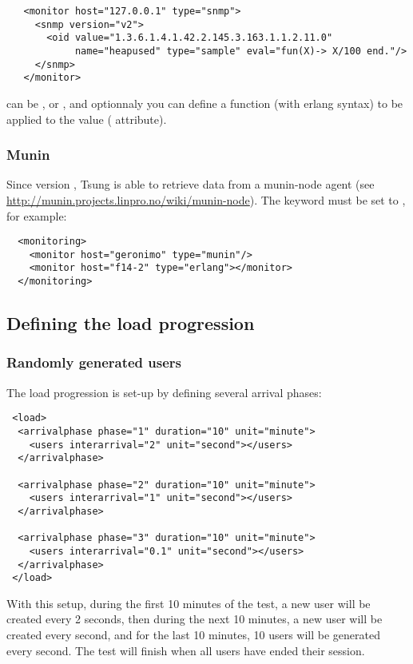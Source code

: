 \documentclass{TSUNG-en}
\begin{document}
\begin{Verbatim}
   <monitor host="127.0.0.1" type="snmp">
     <snmp version="v2">
       <oid value="1.3.6.1.4.1.42.2.145.3.163.1.1.2.11.0"
            name="heapused" type="sample" eval="fun(X)-> X/100 end."/>
     </snmp>
   </monitor>
\end{Verbatim}

 can be ,  or
, and optionnaly you can define a function (with erlang
syntax) to be applied to the value ( attribute).

\subsubsection{Munin}

Since version , Tsung is able to retrieve data from a munin-node agent
(see \url{http://munin.projects.linpro.no/wiki/munin-node}). The 
keyword must be set to , for example:

\begin{Verbatim}
  <monitoring>
    <monitor host="geronimo" type="munin"/>
    <monitor host="f14-2" type="erlang"></monitor>
  </monitoring>
\end{Verbatim}

\subsection{Defining the load progression}

\subsubsection{Randomly generated users}

The load progression is set-up by defining several arrival phases:

\begin{Verbatim}
 <load>
  <arrivalphase phase="1" duration="10" unit="minute">
    <users interarrival="2" unit="second"></users>
  </arrivalphase>

  <arrivalphase phase="2" duration="10" unit="minute">
    <users interarrival="1" unit="second"></users>
  </arrivalphase>

  <arrivalphase phase="3" duration="10" unit="minute">
    <users interarrival="0.1" unit="second"></users>
  </arrivalphase>
 </load>
\end{Verbatim}

With this setup, during the first 10 minutes of the test, a new user
will be created every 2 seconds, then during the next 10 minutes, a
new user will be created every second, and for the last 10 minutes,
10 users will be generated every second. The test will finish when
all users have ended their session.
\end{document}
